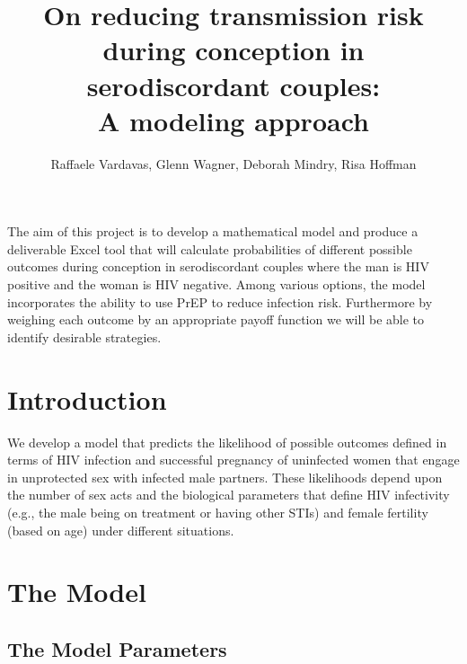 \documentclass[11pt]{nih_mod}
\title{{\bf On reducing transmission risk during conception in serodiscordant couples:} \\ A modeling approach }
\author{Raffaele Vardavas, Glenn Wagner, Deborah Mindry, Risa Hoffman}
\date{}
\begin{document}
\maketitle 

The aim of this project is to develop a mathematical model and produce a deliverable Excel tool that will calculate probabilities of different possible outcomes during conception in serodiscordant couples where the man is HIV positive and the woman is HIV negative. Among various options, the model incorporates the ability to use PrEP to reduce infection risk. Furthermore by weighing each outcome by an appropriate payoff function we will be able to identify desirable strategies. 

\tableofcontents
\pagebreak

\bigskip
\section{Introduction}

We develop a model that predicts the likelihood of possible outcomes defined in terms of HIV infection and successful pregnancy of uninfected women that engage in unprotected sex with infected male partners. These likelihoods depend upon the number of sex acts and the biological parameters that define HIV infectivity (e.g., the male being on treatment or having other STIs) and female fertility (based on age) under different situations.


\section{The Model}

\subsection{The Model Parameters}
\end{document}
